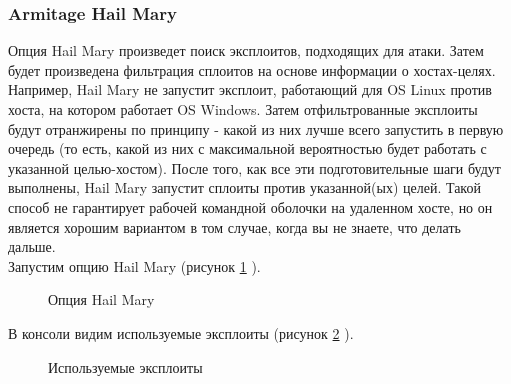 \documentclass[10pt,a4paper]{report}
\begin{document}
\subsubsection{Armitage Hail Mary}
Опция Hail Mary произведет поиск эксплоитов, подходящих для атаки. Затем будет произведена фильтрация сплоитов на основе информации о хостах-целях. Например, Hail Mary не запустит эксплоит, работающий для OS Linux против хоста, на котором работает OS Windows. Затем отфильтрованные эксплоиты будут отранжирены по принципу - какой из них лучше всего запустить в первую очередь (то есть, какой из них с максимальной вероятностью будет работать с указанной целью-хостом). После того, как все эти подготовительные шаги будут выполнены, Hail Mary запустит сплоиты против указанной(ых) целей. Такой способ не гарантирует рабочей командной оболочки на удаленном хосте, но он является хорошим вариантом в том случае, когда вы не знаете, что делать дальше. \\
Запустим опцию Hail Mary (рисунок \ref{ris:img7} ).\\
\begin{figure}[h]
\caption{Опция Hail Mary}
\label{ris:img7}   
\end{figure}
В консоли видим используемые эксплоиты (рисунок \ref{ris:img8} ).\\
\begin{figure}[h]
\caption{Используемые эксплоиты}
\label{ris:img8}  
\end{figure}
\end{document}
